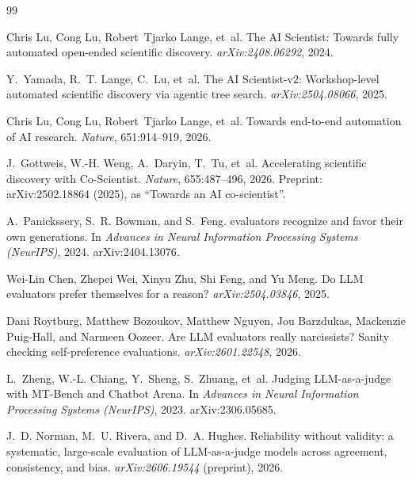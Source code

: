 \documentclass[11pt,letterpaper]{article}
\begin{document}
\begin{thebibliography}{99}\small

Chris Lu, Cong Lu, Robert~Tjarko Lange, et~al.
\newblock The {AI} {Scientist}: Towards fully automated open-ended scientific discovery.
\newblock \emph{arXiv:2408.06292}, 2024.

Y.~Yamada, R.~T. Lange, C.~Lu, et~al.
\newblock The {AI} {Scientist}-v2: Workshop-level automated scientific discovery via agentic tree search.
\newblock \emph{arXiv:2504.08066}, 2025.

Chris Lu, Cong Lu, Robert~Tjarko Lange, et~al.
\newblock Towards end-to-end automation of {AI} research.
\newblock \emph{Nature}, 651:914--919, 2026.

J.~Gottweis, W.-H. Weng, A.~Daryin, T.~Tu, et~al.
\newblock Accelerating scientific discovery with {Co-Scientist}.
\newblock \emph{Nature}, 655:487--496, 2026. Preprint: arXiv:2502.18864 (2025), as ``Towards an {AI} co-scientist''.

A.~Panickssery, S.~R. Bowman, and S.~Feng.
 evaluators recognize and favor their own generations.
\newblock In \emph{Advances in Neural Information Processing Systems (NeurIPS)}, 2024.
\newblock arXiv:2404.13076.

Wei-Lin Chen, Zhepei Wei, Xinyu Zhu, Shi Feng, and Yu Meng.
\newblock Do {LLM} evaluators prefer themselves for a reason?
\newblock \emph{arXiv:2504.03846}, 2025.

Dani Roytburg, Matthew Bozoukov, Matthew Nguyen, Jou Barzdukas, Mackenzie Puig-Hall, and Narmeen Oozeer.
\newblock Are {LLM} evaluators really narcissists? {S}anity checking self-preference evaluations.
\newblock \emph{arXiv:2601.22548}, 2026.

L.~Zheng, W.-L. Chiang, Y.~Sheng, S.~Zhuang, et~al.
\newblock Judging {LLM}-as-a-judge with {MT}-{Bench} and {Chatbot} {Arena}.
\newblock In \emph{Advances in Neural Information Processing Systems (NeurIPS)}, 2023.
\newblock arXiv:2306.05685.

J.~D. Norman, M.~U. Rivera, and D.~A. Hughes.
\newblock Reliability without validity: a systematic, large-scale evaluation of {LLM}-as-a-judge models across agreement, consistency, and bias.
\newblock \emph{arXiv:2606.19544} (preprint), 2026.


\end{thebibliography}
\end{document}
